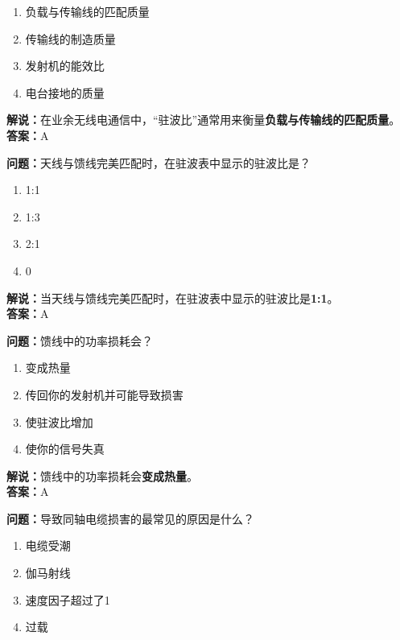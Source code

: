 \begin{enumerate}[label=\Alph*), leftmargin=1cm]
	\item 负载与传输线的匹配质量
	\item 传输线的制造质量
	\item 发射机的能效比
	\item 电台接地的质量
\end{enumerate}

\textbf{解说：}在业余无线电通信中，“驻波比”通常用来衡量\textbf{负载与传输线的匹配质量}。\\\textbf{答案：}A



\textbf{问题：}天线与馈线完美匹配时，在驻波表中显示的驻波比是？

\begin{enumerate}[label=\Alph*), leftmargin=1cm]
	\item 1:1
	\item 1:3
	\item 2:1
	\item 0
\end{enumerate}

\textbf{解说：}当天线与馈线完美匹配时，在驻波表中显示的驻波比是\textbf{1:1}。\\\textbf{答案：}A



\textbf{问题：}馈线中的功率损耗会？

\begin{enumerate}[label=\Alph*), leftmargin=1cm]
	\item 变成热量
	\item 传回你的发射机并可能导致损害
	\item 使驻波比增加
	\item 使你的信号失真
\end{enumerate}

\textbf{解说：}馈线中的功率损耗会\textbf{变成热量}。\\\textbf{答案：}A



\textbf{问题：}导致同轴电缆损害的最常见的原因是什么？

\begin{enumerate}[label=\Alph*), leftmargin=1cm]
	\item 电缆受潮
	\item 伽马射线
	\item 速度因子超过了1
	\item 过载
\end{enumerate}

